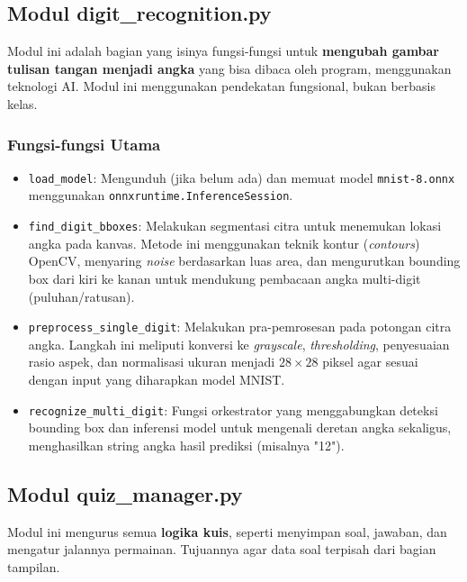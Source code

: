 \subsection{Modul digit\_recognition.py}
Modul ini adalah bagian yang isinya fungsi-fungsi untuk \textbf{mengubah gambar tulisan tangan menjadi angka} yang bisa dibaca oleh program, menggunakan teknologi AI. Modul ini menggunakan pendekatan fungsional, bukan berbasis kelas.

\subsubsection{Fungsi-fungsi Utama}
\begin{itemize}
    \item \texttt{load\_model}: Mengunduh (jika belum ada) dan memuat model \texttt{mnist-8.onnx} menggunakan \texttt{onnxruntime.InferenceSession}.
    \item \texttt{find\_digit\_bboxes}: Melakukan segmentasi citra untuk menemukan lokasi angka pada kanvas. Metode ini menggunakan teknik kontur (\textit{contours}) OpenCV, menyaring \textit{noise} berdasarkan luas area, dan mengurutkan bounding box dari kiri ke kanan untuk mendukung pembacaan angka multi-digit (puluhan/ratusan).
    \item \texttt{preprocess\_single\_digit}: Melakukan pra-pemrosesan pada potongan citra angka. Langkah ini meliputi konversi ke \textit{grayscale}, \textit{thresholding}, penyesuaian rasio aspek, dan normalisasi ukuran menjadi $28 \times 28$ piksel agar sesuai dengan input yang diharapkan model MNIST.
    \item \texttt{recognize\_multi\_digit}: Fungsi orkestrator yang menggabungkan deteksi bounding box dan inferensi model untuk mengenali deretan angka sekaligus, menghasilkan string angka hasil prediksi (misalnya "12").
\end{itemize}

\subsection{Modul quiz\_manager.py}
Modul ini mengurus semua \textbf{logika kuis}, seperti menyimpan soal, jawaban, dan mengatur jalannya permainan. Tujuannya agar data soal terpisah dari bagian tampilan.

